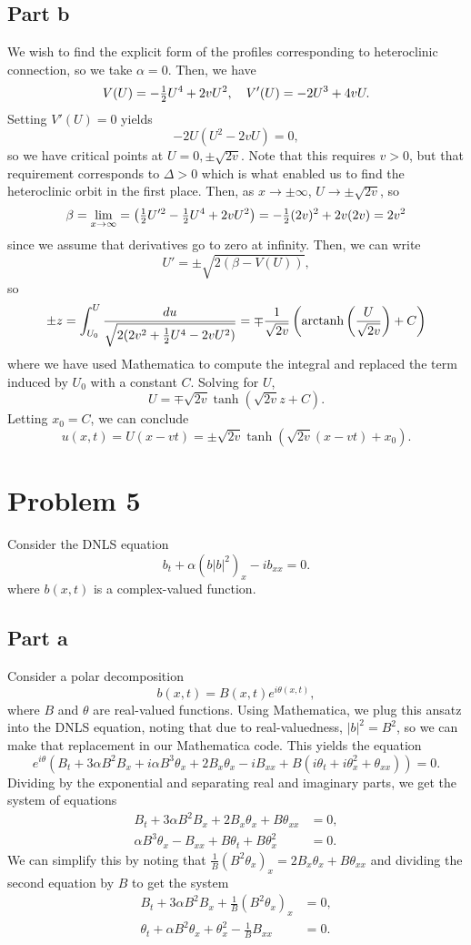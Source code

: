 \documentclass{article}
\begin{document}
\subsection{Part b}
We wish to find the explicit form of the profiles corresponding to heteroclinic connection, so we take $\alpha=0$. Then, we have 
\[
V(U)=-\mbox{$\frac{1}{2}$} U^4+2vU^2,\quad V'(U)=-2U^3+4vU.
\]
Setting $V'(U)=0$ yields 
\[
-2U(U^2-2vU)=0,
\]
so we have critical points at $U=0,\pm\sqrt{2v}$. Note that this requires $v>0$, but that requirement corresponds to $\Delta>0$ which is what enabled us to find the heteroclinic orbit in the first place. Then, as $x\to\pm\infty$, $U\to\pm\sqrt{2v}$, so
\[
\beta=\lim_{x\to\infty}=\left(\mbox{$\frac{1}{2}$} U'^2-\mbox{$\frac{1}{2}$} U^4+2vU^2\right)=-\mbox{$\frac{1}{2}$}(2v)^2+2v(2v)=2v^2
\]
since we assume that derivatives go to zero at infinity. Then, we can write
\[
U'=\pm\sqrt{2(\beta-V(U))},
\]
so 
\begin{align*}
\pm z=\int_{U_0}^{U}\frac{du}{\sqrt{2(2v^2+\mbox{$\frac{1}{2}$} U^4-2vU^2)}}=\mp\frac{1}{\sqrt{2v}}\left(\operatorname{arctanh}\left(\frac{U}{\sqrt{2v}}\right)+C\right)
\end{align*}
where we have used Mathematica to compute the integral and replaced the term induced by $U_0$ with a constant $C$. Solving for $U$,
\[
U=\mp\sqrt{2v}\tanh(\sqrt{2v}z+C).
\]
Letting $x_0=C$, we can conclude
\[
u(x,t)=U(x-vt)=\pm\sqrt{2v}\tanh(\sqrt{2v}(x-vt)+x_0).
\] 

\section{Problem 5}
Consider the DNLS equation
$$
b_t+\alpha \left(b |b|^2\right)_x-i b_{xx}=0.
$$
where $b(x,t)$ is a complex-valued function.
\subsection{Part a}
Consider a polar decomposition
$$
b(x,t)=B(x,t)e^{i\theta(x,t)},
$$
where $B$ and $\theta$ are real-valued functions. Using Mathematica, we plug this ansatz into the DNLS equation, noting that due to real-valuedness, $|b|^2=B^2$, so we can make that replacement in our Mathematica code. This yields the equation
\[
e^{i\theta}(B_t+3\alpha B^2B_x+i\alpha B^3\theta_x+2B_x\theta_x-iB_{xx}+B(i\theta_t+i\theta_x^2+\theta_{xx}))=0.
\]
Dividing by the exponential and separating real and imaginary parts, we get the system of equations
\begin{align*}
	B_t+3\alpha B^2B_x+2B_x\theta_x+B\theta_{xx}&=0,\\
	\alpha B^3\theta_x-B_{xx}+B\theta_t+B\theta_x^2&=0.
\end{align*}
We can simplify this by noting that $\frac{1}{B}(B^2 \theta_x)_x=2B_x\theta_x+B\theta_{xx}$ and dividing the second equation by $B$ to get the system
\begin{align*}
	B_t+3\alpha B^2 B_x+\frac{1}{B}(B^2 \theta_x)_x&=0,\\
	\theta_t+\alpha B^2 \theta_x+\theta_x^2-\frac{1}{B}B_{xx}&=0.
\end{align*}
\end{document}
